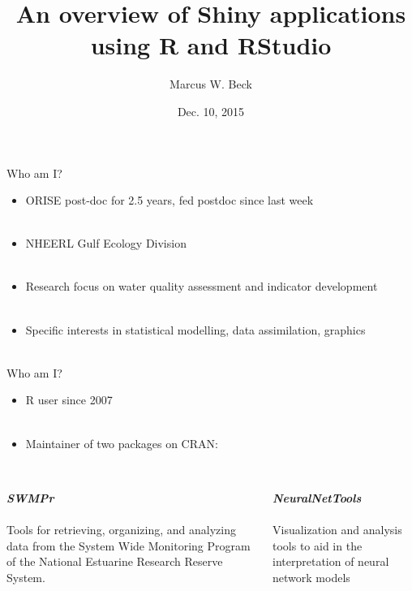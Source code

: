 \documentclass[serif]{beamer}\usepackage[]{graphicx}\usepackage[]{color}
\newcommand{\emtxt}[1]{\textbf{\textit{#1}}}
\begin{document}
\title[Shiny Overview]{\textbf{An overview of Shiny applications using R and RStudio}\vspace{-0.15in}}
\author[M. Beck]{Marcus W. Beck}


\date{Dec. 10, 2015}

\begin{frame}
\titlepage
\end{frame}

\begin{frame}{Who am I?}
\begin{itemize}
\item ORISE post-doc for 2.5 years, fed postdoc since last week \\~\\
\item NHEERL Gulf Ecology Division \\~\\
\item Research focus on water quality assessment and indicator development \\~\\
\item Specific interests in statistical modelling, data assimilation, graphics  \\~\\
\end{itemize}
\end{frame}

\begin{frame}{Who am I?}
\begin{itemize}
\item R user since 2007 \\~\\
\item Maintainer of two packages on CRAN: \\~\\
\end{itemize}
\begin{columns}[T]
\begin{column}{0.45\textwidth}
\emtxt{SWMPr}\\~\\
Tools for retrieving, organizing, and analyzing data from the System Wide Monitoring Program of the National Estuarine Research Reserve System. 
\end{column}
\begin{column}{0.45\textwidth}
\emtxt{NeuralNetTools} \\~\\
Visualization and analysis tools to aid in the interpretation of neural network models
\end{column}
\end{columns}
\end{frame}
\end{document}
